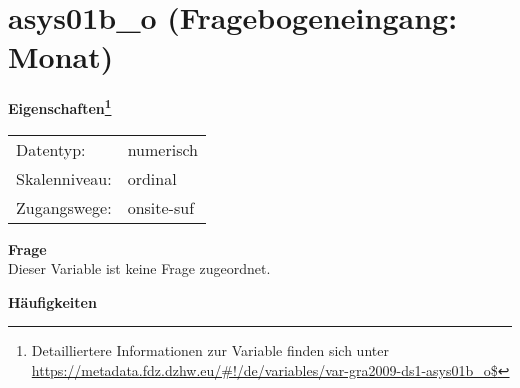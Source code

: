 
    \setcounter{footnote}{0}

    \vspace*{-1.8cm}
	\section{asys01b\_o (Fragebogeneingang: Monat)}
	\label{section:asys01b_o}



    \vspace*{0.5cm}
    \noindent\textbf{Eigenschaften\footnote{Detailliertere Informationen zur Variable finden sich unter
		\url{https://metadata.fdz.dzhw.eu/\#!/de/variables/var-gra2009-ds1-asys01b_o$}}}\\
	\begin{tabularx}{\hsize}{@{}lX}
	Datentyp: & numerisch \\
	Skalenniveau: & ordinal \\
	Zugangswege: &
	  onsite-suf
 \\
    \end{tabularx}



		\vspace*{0.5cm}
		\noindent\textbf{Frage}\\
		Dieser Variable ist keine Frage zugeordnet.





        		\vspace*{0.5cm}
                \noindent\textbf{Häufigkeiten}

